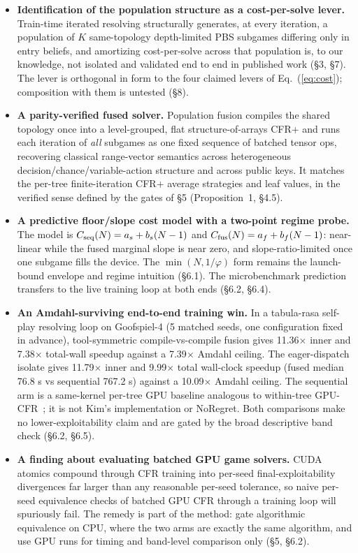 \documentclass[11pt]{article}
\begin{document}
\begin{itemize}
\item \textbf{Identification of the population structure as a cost-per-solve lever.}
Train-time iterated resolving structurally generates, at every iteration, a population
of $K$ same-topology depth-limited PBS subgames differing only in entry beliefs, and
amortizing cost-per-solve across that population is, to our knowledge, not isolated and
validated end to end in published work (\S3, \S7). The lever is orthogonal in form to
the four claimed levers of Eq.~(\ref{eq:cost}); composition with them is untested
(\S8).
\item \textbf{A parity-verified fused solver.} Population fusion compiles the shared
topology once into a level-grouped, flat structure-of-arrays CFR+ and runs each
iteration of \emph{all} subgames as one fixed sequence of batched tensor ops, recovering
classical range-vector semantics across heterogeneous decision/chance/variable-action
structure and across public keys. It matches the per-tree finite-iteration CFR+ average
strategies and leaf values, in the verified sense defined by the gates of \S5
(Proposition~1, \S4.5).
\item \textbf{A predictive floor/slope cost model with a two-point regime probe.}
The model is
$C_{\rm seq}(N)=a_s+b_s(N-1)$ and
$C_{\rm fus}(N)=a_f+b_f(N-1)$: near-linear while the fused marginal slope is near zero,
and slope-ratio-limited once one subgame fills the device. The
$\min(N,1/\varphi)$ form remains the launch-bound envelope and regime intuition
(\S6.1). The microbenchmark prediction transfers to the live training loop at both ends
(\S6.2, \S6.4).
\item \textbf{An Amdahl-surviving end-to-end training win.} In a tabula-rasa self-play
resolving loop on Goofspiel-4 (5 matched seeds, one configuration fixed in advance),
tool-symmetric compile-vs-compile fusion gives 11.36$\times$ inner and 7.38$\times$
total-wall speedup against a 7.39$\times$ Amdahl ceiling. The eager-dispatch isolate
gives 11.79$\times$ inner and 9.99$\times$ total wall-clock speedup (fused median 76.8 s
vs sequential 767.2 s) against a 10.09$\times$ Amdahl ceiling. The sequential arm is a
same-kernel per-tree GPU baseline analogous to within-tree GPU-CFR~\citep{Kim2024}; it
is not Kim's implementation or NoRegret. Both comparisons make no lower-exploitability
claim and are gated by the broad descriptive band check (\S6.2, \S6.5).
\item \textbf{A finding about evaluating batched GPU game solvers.} CUDA atomics
compound through CFR training into per-seed final-exploitability divergences far larger
than any reasonable per-seed tolerance, so naive per-seed equivalence checks of batched
GPU CFR through a training loop will spuriously fail. The remedy is part of the method:
gate algorithmic equivalence on CPU, where the two arms are exactly the same algorithm,
and use GPU runs for timing and band-level comparison only (\S5, \S6.2).
\end{itemize}
\end{document}
